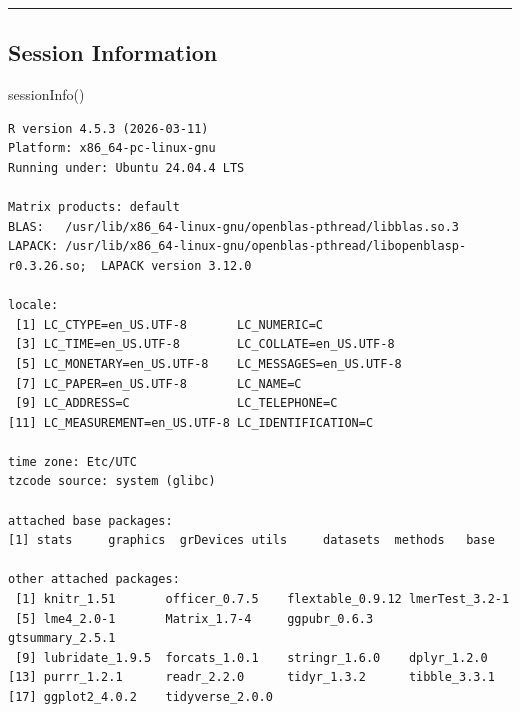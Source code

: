 \documentclass[
  letterpaper,
  DIV=11,
  numbers=noendperiod]{scrartcl}
\newenvironment{Shaded}{\begin{snugshade}}{\end{snugshade}}
\newcommand{\FunctionTok}[1]{\textcolor[rgb]{0.28,0.35,0.67}{#1}}
\newcommand{\NormalTok}[1]{\textcolor[rgb]{0.00,0.23,0.31}{#1}}
\begin{document}
\begin{center}\rule{0.5\linewidth}{0.5pt}\end{center}

\subsection{Session Information}\label{session-information}

\begin{Shaded}
\begin{Highlighting}[]
\FunctionTok{sessionInfo}\NormalTok{()}
\end{Highlighting}
\end{Shaded}

\begin{verbatim}
R version 4.5.3 (2026-03-11)
Platform: x86_64-pc-linux-gnu
Running under: Ubuntu 24.04.4 LTS

Matrix products: default
BLAS:   /usr/lib/x86_64-linux-gnu/openblas-pthread/libblas.so.3 
LAPACK: /usr/lib/x86_64-linux-gnu/openblas-pthread/libopenblasp-r0.3.26.so;  LAPACK version 3.12.0

locale:
 [1] LC_CTYPE=en_US.UTF-8       LC_NUMERIC=C              
 [3] LC_TIME=en_US.UTF-8        LC_COLLATE=en_US.UTF-8    
 [5] LC_MONETARY=en_US.UTF-8    LC_MESSAGES=en_US.UTF-8   
 [7] LC_PAPER=en_US.UTF-8       LC_NAME=C                 
 [9] LC_ADDRESS=C               LC_TELEPHONE=C            
[11] LC_MEASUREMENT=en_US.UTF-8 LC_IDENTIFICATION=C       

time zone: Etc/UTC
tzcode source: system (glibc)

attached base packages:
[1] stats     graphics  grDevices utils     datasets  methods   base     

other attached packages:
 [1] knitr_1.51       officer_0.7.5    flextable_0.9.12 lmerTest_3.2-1  
 [5] lme4_2.0-1       Matrix_1.7-4     ggpubr_0.6.3     gtsummary_2.5.1 
 [9] lubridate_1.9.5  forcats_1.0.1    stringr_1.6.0    dplyr_1.2.0     
[13] purrr_1.2.1      readr_2.2.0      tidyr_1.3.2      tibble_3.3.1    
[17] ggplot2_4.0.2    tidyverse_2.0.0 


\end{verbatim}
\end{document}
